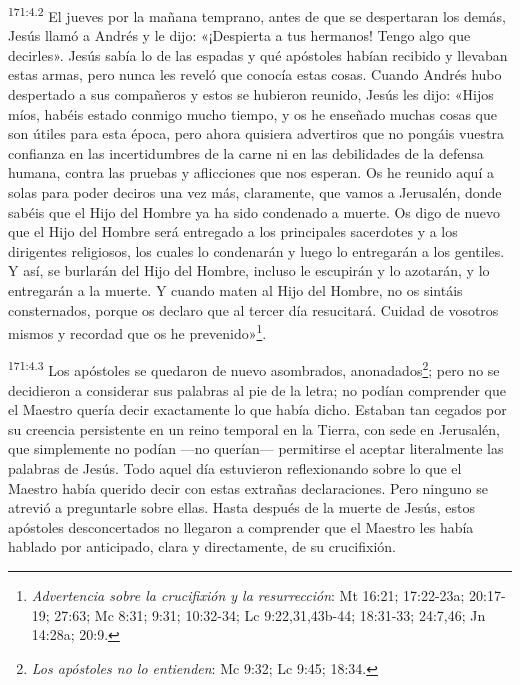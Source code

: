 \par 
\textsuperscript{171:4.2} El jueves por la mañana temprano, antes de que se despertaran los demás, Jesús llamó a Andrés y le dijo: «¡Despierta a tus hermanos! Tengo algo que decirles». Jesús sabía lo de las espadas y qué apóstoles habían recibido y llevaban estas armas, pero nunca les reveló que conocía estas cosas. Cuando Andrés hubo despertado a sus compañeros y estos se hubieron reunido, Jesús les dijo: «Hijos míos, habéis estado conmigo mucho tiempo, y os he enseñado muchas cosas que son útiles para esta época, pero ahora quisiera advertiros que no pongáis vuestra confianza en las incertidumbres de la carne ni en las debilidades de la defensa humana, contra las pruebas y aflicciones que nos esperan. Os he reunido aquí a solas para poder deciros una vez más, claramente, que vamos a Jerusalén, donde sabéis que el Hijo del Hombre ya ha sido condenado a muerte. Os digo de nuevo que el Hijo del Hombre será entregado a los principales sacerdotes y a los dirigentes religiosos, los cuales lo condenarán y luego lo entregarán a los gentiles. Y así, se burlarán del Hijo del Hombre, incluso le escupirán y lo azotarán, y lo entregarán a la muerte. Y cuando maten al Hijo del Hombre, no os sintáis consternados, porque os declaro que al tercer día resucitará. Cuidad de vosotros mismos y recordad que os he prevenido»\footnote{\textit{Advertencia sobre la crucifixión y la resurrección}: Mt 16:21; 17:22-23a; 20:17-19; 27:63; Mc 8:31; 9:31; 10:32-34; Lc 9:22,31,43b-44; 18:31-33; 24:7,46; Jn 14:28a; 20:9.}.

\par 
\textsuperscript{171:4.3} Los apóstoles se quedaron de nuevo asombrados, anonadados\footnote{\textit{Los apóstoles no lo entienden}: Mc 9:32; Lc 9:45; 18:34.}; pero no se decidieron a considerar sus palabras al pie de la letra; no podían comprender que el Maestro quería decir exactamente lo que había dicho. Estaban tan cegados por su creencia persistente en un reino temporal en la Tierra, con sede en Jerusalén, que simplemente no podían ---no querían--- permitirse el aceptar literalmente las palabras de Jesús. Todo aquel día estuvieron reflexionando sobre lo que el Maestro había querido decir con estas extrañas declaraciones. Pero ninguno se atrevió a preguntarle sobre ellas. Hasta después de la muerte de Jesús, estos apóstoles desconcertados no llegaron a comprender que el Maestro les había hablado por anticipado, clara y directamente, de su crucifixión.

